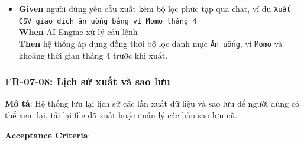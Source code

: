 \begin{itemize}
\item \textbf{Given} người dùng yêu cầu xuất kèm bộ lọc phức tạp qua chat, ví dụ \texttt{Xuất CSV giao dịch ăn uống bằng ví Momo tháng 4}  \\ \hspace*{1.5em}  \textbf{When} AI Engine xử lý câu lệnh  \\ \hspace*{1.5em}  \textbf{Then} hệ thống áp dụng đồng thời bộ lọc danh mục \texttt{Ăn uống}, ví \texttt{Momo} và khoảng thời gian tháng 4 trước khi xuất.
\end{itemize}
\subsubsection{FR-07-08: Lịch sử xuất và sao lưu}

\textbf{Mô tả}: Hệ thống lưu lại lịch sử các lần xuất dữ liệu và sao lưu để người dùng có thể xem lại, tải lại file đã xuất hoặc quản lý các bản sao lưu cũ.



\textbf{Acceptance Criteria}:

